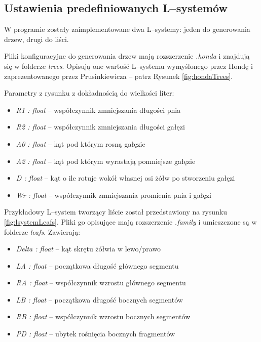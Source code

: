 \documentclass[inz,longabstract]{iithesis}
\begin{document}
        \subsection{Ustawienia predefiniowanych L--systemów}
        W programie zostały zaimplementowane dwa L--systemy: jeden do generowania drzew, drugi do liści.
        
        Pliki konfiguracyjne do generowania drzew mają rozszerzenie \textit{.honda} i znajdują się w folderze \textit{trees}. Opisują one wartość L--systemu wymyślonego przez Hondę \cite{honda} i zaprezentowanego przez Prusinkiewicza \cite{plants} -- patrz Rysunek \ref{fig:hondaTrees}.
        
        Parametry z rysunku z dokładnością do wielkości liter:
        \begin{itemize}
            \item \textit{R1 : float} -- współczynnik zmniejszania długości pnia
            \item \textit{R2 : float} -- współczynnik zmniejszania długości gałęzi
            \item \textit{A0 : float} -- kąt pod którym rosną gałęzie
            \item \textit{A2 : float} -- kąt pod którym wyrastają pomniejsze gałęzie
            \item \textit{D : float} -- kąt o ile rotuje wokół własnej osi żółw po stworzeniu gałęzi
            \item \textit{Wr : float} -- współczynnik zmniejszania promienia pnia i gałęzi
        \end{itemize}    
        
        Przykładowy L--system tworzący liście został przedstawiony na rysunku \ref{fig:lsystemLeafs}. Pliki go opisujące mają rozszerzenie \textit{.family} i umieszczone są w folderze \textit{leafs}. Zawierają:
        \begin{itemize}
            \item \textit{Delta : float} -- kąt skrętu żółwia w lewo/prawo
            \item \textit{LA : float} -- początkowa długość głównego segmentu
            \item \textit{RA : float} -- współczynnik wzrostu głównego segmentu
            \item \textit{LB : float} -- początkowa długość bocznych segmentów
            \item \textit{RB : float} -- współczynnik wzrostu bocznych segmentów
            \item \textit{PD : float} -- ubytek rośnięcia bocznych fragmentów
        \end{itemize}    
        
\end{document}
